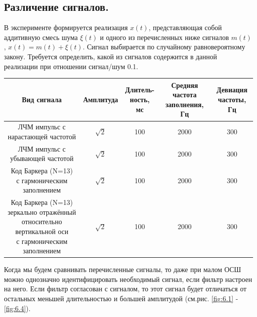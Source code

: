 \subsection{Различение сигналов.}


В эксперименте формируется реализация $x(t)$, представляющая собой
аддитивную смесь шума $\xi(t)$ и одного из перечисленных ниже сигналов $m(t)$,
$x(t)=m(t)+ \xi(t)$. Сигнал выбирается по случайному равновероятному закону.
Требуется определить, какой из сигналов содержится в данной реализации при
отношении сигнал/шум 0.1.

\begin{table}[H]
    \centering
    \small
    \begin{tabular}{|c|c|c|c|c|}
    \hline
    Вид сигнала & Амплитуда & \makecell{Длитель- \\ность, мс} & \makecell{Средняя частота \\
    заполнения, Гц} &
    \makecell{Девиация \\                        частоты, Гц} \\
    \hline 
    \makecell{ ЛЧМ импульс с \\ нарастающей частотой} & $\sqrt 2$& 100 & 2000 & 300 \\
    \hline 
\makecell{ ЛЧМ импульс с \\ убывающей частотой} & $\sqrt 2$& 100 & 2000 & 300 \\
    \hline 
\makecell{Код Баркера (N=13) \\ с гармоническим заполнением } & $\sqrt 2$& 100 & 2000 & 300 \\
    \hline 
    \makecell {Код Баркера (N=13)  \\ зеркально
отражённый  \\
относительно \\ 
вертикальной оси\\ с гармоническим заполнением} & $\sqrt 2$& 100 & 2000 & 300 \\
    \hline
    \end{tabular}
\end{table}


Когда мы будем сравнивать перечисленные сигналы, то даже при малом ОСШ
можно однозначно идентифицировать необходимый сигнал, если фильтр настроен на
него. Если фильтр согласован с сигналом, то этот сигнал будет отличаться от
остальных  меньшей длительностью и большей
амплитудой (см.рис. \ref{fig:6.1} - \ref{fig:6.4}). 




